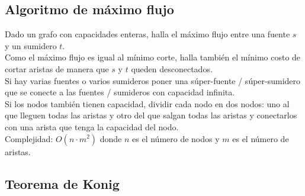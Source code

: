\documentclass[10pt,letterpaper]{article}
\newcommand{\source}[1]{
  
  \dotfill
}
\begin{document}
  \subsection{Algoritmo de máximo flujo}
    Dado un grafo con capacidades enteras, halla el máximo flujo entre una fuente $s$ y un sumidero $t$.\\
    Como el máximo flujo es igual al mínimo corte, halla también el mínimo costo de cortar aristas de manera que $s$ y $t$ queden desconectados.\\
    Si hay varias fuentes o varios sumideros poner una súper-fuente / súper-sumidero que se conecte a las fuentes / sumideros con capacidad infinita.\\
    Si los nodos también tienen capacidad, dividir cada nodo en dos nodos: uno al que lleguen todas las aristas y otro del que salgan todas las aristas y conectarlos con una arista que tenga la capacidad del nodo.\\
    Complejidad: $O(n \cdot m^2)$ donde $n$ es el número de nodos y $m$ es el número de aristas.\\
    \source{./src/maxflow.cpp}
  \subsection{Teorema de Konig}
\end{document}
